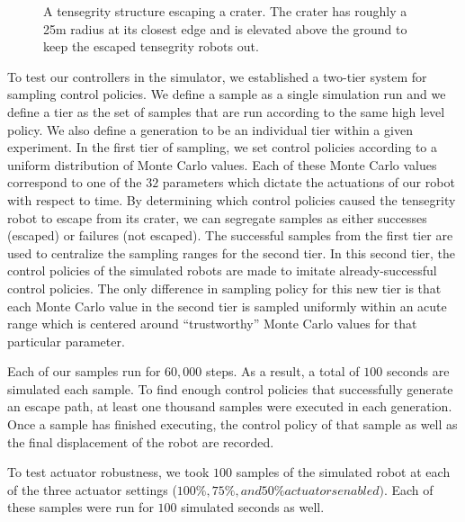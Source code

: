 \documentclass{llncs}
\begin{document}
{\begin{figure}
\caption{A tensegrity structure escaping a crater. 
The crater has roughly a 25m radius at its closest edge and is elevated above the ground to keep the escaped tensegrity robots out.
}
\label{escapemontage}
\end{figure} 

To test our controllers in the simulator, we established a two-tier system for sampling control policies.
We define a sample as a single simulation run and we define a tier as the set of samples that are run according to the same high level policy.
We also define a generation to be an individual tier within a given experiment.
In the first tier of sampling, we set control policies according to a uniform distribution of Monte Carlo values.
Each of these Monte Carlo values correspond to one of the $32$ parameters which dictate the actuations of our robot with respect to time.
By determining which control policies caused the tensegrity robot to escape from its crater, we can segregate samples as either successes (escaped) or failures (not escaped).
The successful samples from the first tier are used to centralize the sampling ranges for the second tier.
In this second tier, the control policies of the simulated robots are made to imitate already-successful control policies.
The only difference in sampling policy for this new tier is that each Monte Carlo value in the second tier is sampled uniformly within an acute range which is centered around ``trustworthy'' Monte Carlo values for that particular parameter.
 
Each of our samples run for $60,000$ steps.
As a result, a total of $100$ seconds are simulated each sample.
To find enough control policies that successfully generate an escape path, at least one thousand samples were executed in each generation.
Once a sample has finished executing, the control policy of that sample as well as the final displacement of the robot are recorded.

To test actuator robustness, we took $100$ samples of the simulated robot at each of the three actuator settings ($100\%, 75\%, and 50\% actuators enabled)$.
Each of these samples were run for $100$ simulated seconds as well.
}
\end{document}
